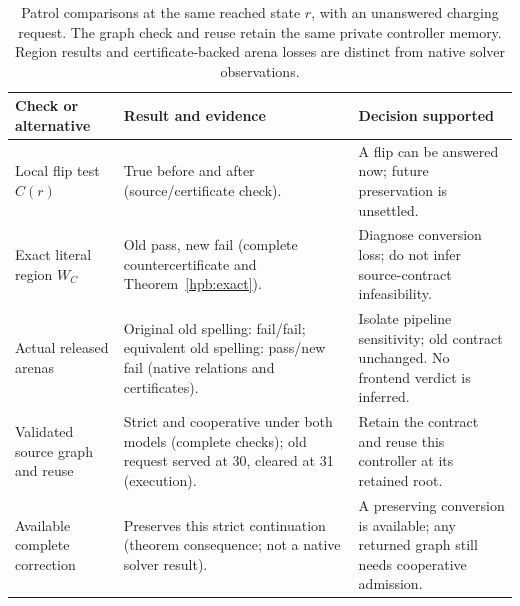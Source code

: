 \begin{table}[htbp]
\centering\small
\caption{Patrol comparisons at the same reached state $r$, with an
unanswered charging request. The graph check and reuse retain the same
private controller memory. Region results and certificate-backed arena
losses are distinct from native solver observations.}
\label{tab:entry-decisions}
\begin{tabular}{@{}L{27mm}L{61mm}L{63mm}@{}}\toprule
Check or alternative & Result and evidence & Decision supported\\\midrule
Local flip test $C(r)$ & True before and after (source/certificate check). & A flip can be answered now; future preservation is unsettled.\\
Exact literal region $W_C$ & Old pass, new fail (complete countercertificate and Theorem~\ref{hpb:exact}). & Diagnose conversion loss; do not infer source-contract infeasibility.\\
Actual released arenas & Original old spelling: fail/fail; equivalent old spelling: pass/new fail (native relations and certificates). & Isolate pipeline sensitivity; old contract unchanged. No frontend verdict is inferred.\\
Validated source graph and reuse & Strict and cooperative under both models (complete checks); old request served at 30, cleared at 31 (execution). & Retain the contract and reuse this controller at its retained root.\\
Available complete correction & Preserves this strict continuation (theorem consequence; not a native solver result). & A preserving conversion is available; any returned graph still needs cooperative admission.\\\bottomrule
\end{tabular}
\end{table}
